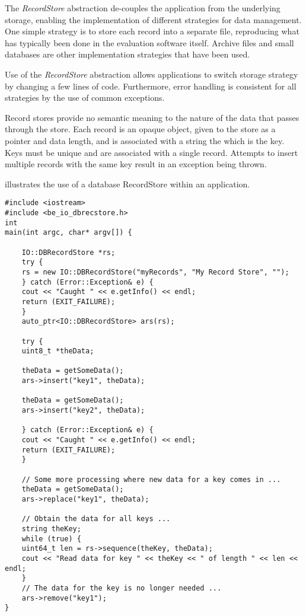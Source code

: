 The {\em RecordStore} abstraction de-couples the application from
the underlying storage, enabling the implementation of different strategies for
data management. One simple strategy is to store each record into a separate
file, reproducing what has typically been done in the evaluation software
itself. Archive files and small databases are other implementation strategies
that have been used.

Use of the {\em RecordStore} abstraction allows applications to switch
storage strategy by changing a few lines of code. Furthermore, error handling
is consistent for all strategies by the use of common exceptions.

Record stores provide no semantic meaning to the nature of the data that passes
through the store. Each record is an opaque object, given to the store as a
pointer and data length, and is associated with a string the which is the key.
Keys must
be unique and are associated with a single record. Attempts to insert multiple
records with the same key result in an exception being thrown.

 illustrates the use of a database RecordStore
within an application.

\lstset{language=c++}
\begin{lstlisting}[caption={Using a RecordStore}, label=recordstoreuse]
#include <iostream>
#include <be_io_dbrecstore.h>
int
main(int argc, char* argv[]) {

    IO::DBRecordStore *rs;
    try {
	rs = new IO::DBRecordStore("myRecords", "My Record Store", "");
    } catch (Error::Exception& e) {
	cout << "Caught " << e.getInfo() << endl;
	return (EXIT_FAILURE);
    }
    auto_ptr<IO::DBRecordStore> ars(rs);

    try {
	uint8_t *theData;

	theData = getSomeData();
	ars->insert("key1", theData);

	theData = getSomeData();
	ars->insert("key2", theData);

    } catch (Error::Exception& e) {
	cout << "Caught " << e.getInfo() << endl;
	return (EXIT_FAILURE);
    }

    // Some more processing where new data for a key comes in ...
    theData = getSomeData();
    ars->replace("key1", theData);
  
    // Obtain the data for all keys ...
    string theKey;
    while (true) {
	uint64_t len = rs->sequence(theKey, theData);
	cout << "Read data for key " << theKey << " of length " << len << endl;
    }
    // The data for the key is no longer needed ...
    ars->remove("key1");
}
\end{lstlisting}

